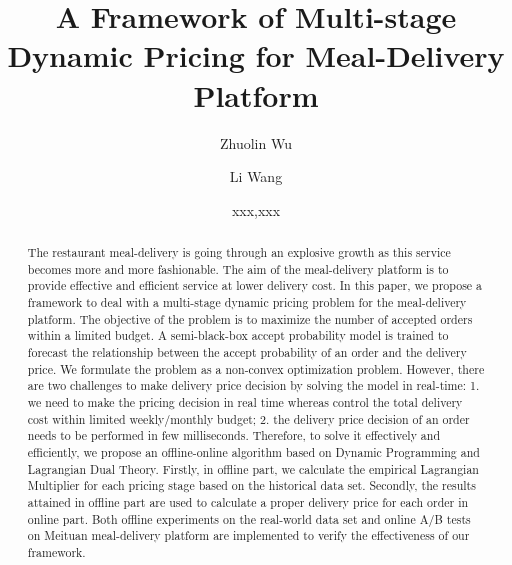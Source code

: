 \documentclass[sigconf,authordraft]{acmart}
\begin{document}
\title{A Framework of Multi-stage Dynamic Pricing for Meal-Delivery Platform}

\author{Zhuolin Wu}
\author{Li Wang}
\authornotemark[1]
\author{xxx,xxx}



\renewcommand{\shortauthors}{Zhuolin and Li, et al.}

\begin{abstract}
 The restaurant meal-delivery is going through an explosive growth as this service becomes more and more fashionable. The aim of the meal-delivery platform is to provide effective and efficient service at lower delivery cost. In this paper, we propose a framework to deal with a multi-stage dynamic pricing problem for the meal-delivery platform. The objective of the problem is to maximize the number of accepted orders within a limited budget. A semi-black-box accept probability model is trained to forecast the relationship between the accept probability of an order and the delivery price. We formulate the problem as a non-convex optimization problem. However, there are two challenges to make delivery price decision by solving the model in real-time: 1. we need to make the pricing decision in real time whereas control the total delivery cost within limited weekly/monthly budget; 2. the delivery price decision of an order needs to be performed in few milliseconds. Therefore, to solve it effectively and efficiently, we propose an offline-online algorithm based on Dynamic Programming and Lagrangian Dual Theory. Firstly, in offline part, we calculate the empirical Lagrangian Multiplier for each pricing stage based on the historical data set. Secondly, the results attained in offline part are used to calculate a proper delivery price for each order in online part. Both offline experiments on the real-world data set and online A/B tests on Meituan meal-delivery platform are implemented to verify the effectiveness of our framework.
\end{abstract}
\end{document}
